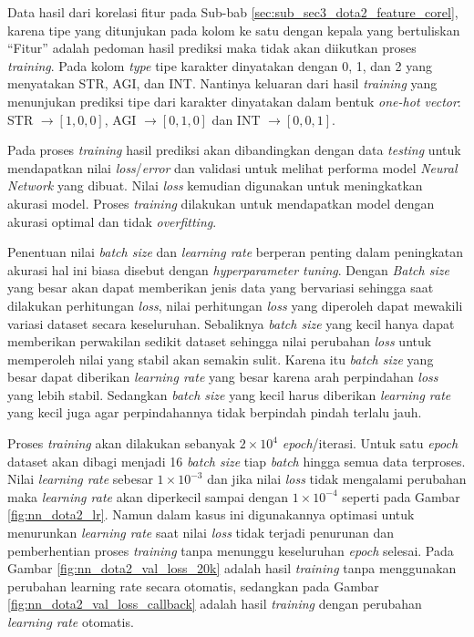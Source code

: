 Data hasil dari korelasi fitur pada Sub-bab \ref{sec:sub_sec3_dota2_feature_corel}, karena tipe yang ditunjukan pada kolom ke satu dengan kepala yang bertuliskan ``Fitur'' adalah pedoman hasil prediksi maka tidak akan diikutkan proses \textit{training}. Pada kolom \textit{type} tipe karakter dinyatakan dengan 0, 1, dan 2 yang menyatakan STR, AGI, dan INT. Nantinya keluaran dari hasil \textit{training} yang menunjukan prediksi tipe dari karakter dinyatakan dalam bentuk \textit{one-hot vector}: STR $\rightarrow [1, 0, 0]$, AGI $\rightarrow [0, 1, 0]$ dan INT $\rightarrow [0, 0, 1]$. 
\vspace{1ex}

Pada proses \textit{training} hasil prediksi akan dibandingkan dengan data \textit{testing} untuk mendapatkan nilai \textit{loss}/\textit{error} dan validasi untuk melihat performa model \textit{Neural Network} yang dibuat. Nilai \textit{loss} kemudian digunakan untuk meningkatkan akurasi model. Proses \textit{training} dilakukan untuk mendapatkan model dengan akurasi optimal dan tidak \textit{overfitting}.
\vspace{1ex}

Penentuan nilai \textit{batch size} dan \textit{learning rate} berperan penting dalam peningkatan akurasi hal ini biasa disebut dengan \textit{hyperparameter tuning}. Dengan \textit{Batch size} yang besar akan dapat memberikan jenis data yang bervariasi sehingga saat dilakukan perhitungan \textit{loss}, nilai perhitungan \textit{loss} yang diperoleh dapat mewakili variasi dataset secara keseluruhan. Sebaliknya \textit{batch size} yang kecil hanya dapat memberikan perwakilan sedikit dataset sehingga nilai perubahan \textit{loss} untuk memperoleh nilai yang stabil akan semakin sulit. Karena itu \textit{batch size} yang besar dapat diberikan \textit{learning rate} yang besar karena arah perpindahan \textit{loss} yang lebih stabil. Sedangkan \textit{batch size} yang kecil harus diberikan \textit{learning rate} yang kecil juga agar perpindahannya tidak berpindah pindah terlalu jauh.
\vspace{1ex}

Proses \textit{training} akan dilakukan sebanyak $2 \times 10^{4}$ \textit{epoch}/iterasi. Untuk satu \textit{epoch} dataset akan dibagi menjadi 16 \textit{batch size} tiap \textit{batch} hingga semua data terproses. Nilai \textit{learning rate} sebesar $1 \times 10^{-3}$ dan jika nilai \textit{loss} tidak mengalami perubahan maka \textit{learning rate} akan diperkecil sampai dengan $1 \times 10^{-4}$ seperti pada Gambar \ref{fig:nn_dota2_lr}. Namun dalam kasus ini digunakannya optimasi untuk menurunkan \textit{learning rate} saat nilai \textit{loss} tidak terjadi penurunan dan pemberhentian proses \textit{training} tanpa menunggu keseluruhan \textit{epoch} selesai. Pada Gambar \ref{fig:nn_dota2_val_loss_20k} adalah hasil \textit{training} tanpa menggunakan perubahan learning rate secara otomatis, sedangkan pada Gambar \ref{fig:nn_dota2_val_loss_callback} adalah hasil \textit{training} dengan perubahan \textit{learning rate} otomatis.
\vspace{1ex}

